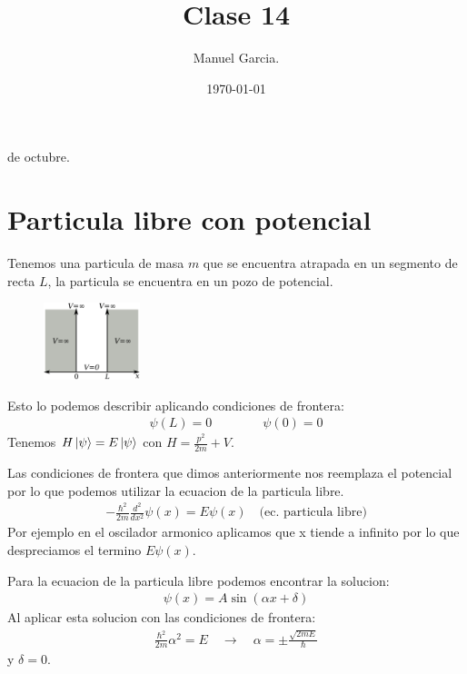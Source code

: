 \documentclass{article}
\title{Clase 14}
\author{Manuel Garcia.}
\date{\today}
\newcommand{\caja}[3]{%
  \begin{tcolorbox}[colback=#1!5!white,colframe=#1!25!black,title=#2]
    #3
  \end{tcolorbox}%
}
\begin{document}
\maketitle

\caja{black}{Revision taller }{
   de octubre.
}
\section{Particula libre con potencial}
Tenemos una particula de masa $ m  $ que se encuentra atrapada en un segmento de recta $ L  $, la particula se encuentra en un pozo de potencial.
\begin{figure}[H]
  \begin{center}
    \includegraphics[width=0.25\textwidth]{pozo_potencial.png}
  \end{center}
\end{figure}
Esto lo podemos describir aplicando condiciones de frontera: 
\begin{gather*}
  \psi(L) = 0 \qquad \qquad \psi(0) = 0  
\end{gather*}
Tenemos $ H \ket{\psi} = E \ket{\psi}$ con $ H = \displaystyle\frac{p ^2}{2m } + V  $. 

Las condiciones de frontera que dimos anteriormente nos reemplaza el potencial por lo que podemos utilizar la ecuacion de la particula libre.
\begin{gather*}
  - \displaystyle\frac{\hbar ^2}{2m }\frac{d ^2  }{d x^2 }\psi(x) = E\psi(x) \quad \text{(ec. particula libre)} 
\end{gather*}
Por ejemplo en el oscilador armonico aplicamos que x tiende a infinito por lo que despreciamos el termino $ E\psi(x) $.

Para la ecuacion de la particula libre podemos encontrar la solucion: 
\begin{gather*}
  \psi(x) = A \sin{(\alpha x + \delta)}
\end{gather*}
Al aplicar esta solucion con las condiciones de frontera:
\begin{gather*}
  \displaystyle\frac{\hbar  ^2}{2m }\alpha ^2 = E \quad \rightarrow \quad \alpha = \pm \displaystyle\frac{\sqrt{2m E } }{\hbar } 
\end{gather*}
y $ \delta = 0  $.
\end{document}
